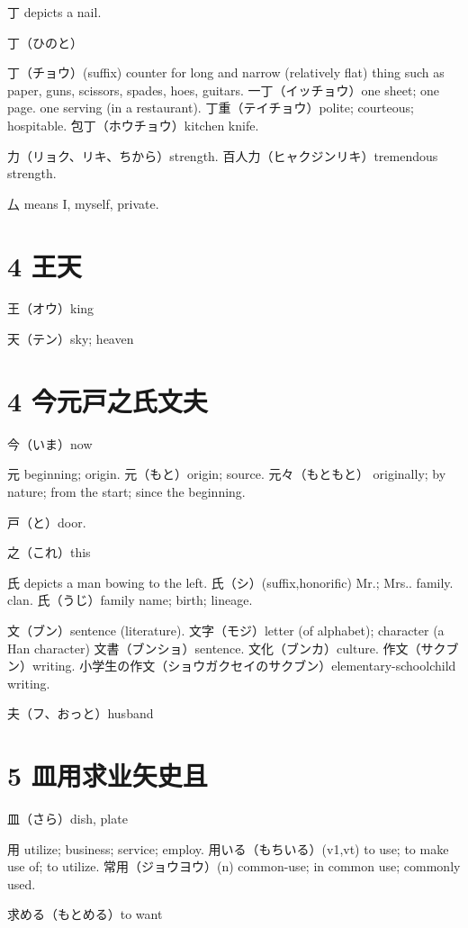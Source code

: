 丁 depicts a nail.

丁（ひのと）

丁（チョウ）(suffix)
counter for long and narrow (relatively flat) thing
such as paper, guns, scissors, spades, hoes, guitars.
一丁（イッチョウ）one sheet; one page.
one serving (in a restaurant).
丁重（テイチョウ）polite; courteous; hospitable.
包丁（ホウチョウ）kitchen knife.

力（リョク、リキ、ちから）strength.
百人力（ヒャクジンリキ）tremendous strength.

厶 means I, myself, private.

\section{4 王天}

王（オウ）king

天（テン）sky; heaven

\section{4 今元戸之氏文夫}

今（いま）now

元 beginning; origin.
元（もと）origin; source.
元々（もともと）
originally; by nature; from the start; since the beginning.

戸（と）door.

之（これ）this

氏 depicts a man bowing to the left.
氏（シ）(suffix,honorific) Mr.; Mrs.. family. clan.
氏（うじ）family name; birth; lineage.

文（ブン）sentence (literature).
文字（モジ）letter (of alphabet); character (a Han character)
文書（ブンショ）sentence.
文化（ブンカ）culture.
作文（サクブン）writing.
小学生の作文（ショウガクセイのサクブン）elementary-schoolchild writing.

夫（フ、おっと）husband

\section{5 皿用求业矢史且}

皿（さら）dish, plate

用 utilize; business; service; employ.
用いる（もちいる）(v1,vt) to use; to make use of; to utilize.
常用（ジョウヨウ）(n) common-use; in common use; commonly used.

求める（もとめる）to want

